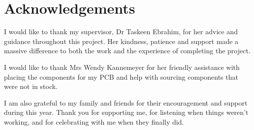 \chapter*{Acknowledgements}
\makeatletter{}\makeatother

I would like to thank my supervisor, Dr Taskeen Ebrahim, for her advice and guidance throughout this project. Her kindness, patience and support made a massive difference to both the work and the experience of completing the project.

I would like to thank Mrs Wendy Kannemeyer for her friendly assistance with placing the components for my PCB and help with sourcing components that were not in stock.

I am also grateful to my family and friends for their encouragement and support during this year. Thank you for supporting me, for listening when things weren't working, and for celebrating with me when they finally did.
